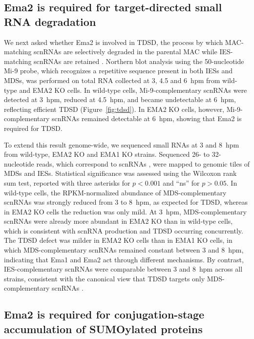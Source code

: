 \documentclass[11pt]{article}
\begin{document}
\subsection{Ema2 is required for target-directed small RNA degradation}

We next asked whether Ema2 is involved in TDSD, the process by which
MAC-matching scnRNAs are selectively degraded in the parental MAC while
IES-matching scnRNAs are retained \citep{aronica2008ema1,schoeberl2012biased}.
Northern blot analysis using the 50-nucleotide Mi-9 probe, which recognizes
a repetitive sequence present in both IESs and MDSs, was performed on total
RNA collected at 3, 4.5 and 6~hpm from wild-type and EMA2 KO cells. In
wild-type cells, Mi-9-complementary scnRNAs were detected at 3~hpm, reduced
at 4.5~hpm, and became undetectable at 6~hpm, reflecting efficient TDSD
(Figure~\ref{fig:tdsd}). In EMA2 KO cells, however, Mi-9-complementary
scnRNAs remained detectable at 6~hpm, showing that Ema2 is required for
TDSD.

To extend this result genome-wide, we sequenced small RNAs at 3 and 8~hpm
from wild-type, EMA2 KO and EMA1 KO strains. Sequenced 26- to 32-nucleotide
reads, which correspond to scnRNAs \citep{schoeberl2012biased}, were mapped
to genomic tiles of MDSs and IESs. Statistical significance was assessed
using the Wilcoxon rank sum test, reported with three asterisks for
$p < 0.001$ and ``ns'' for $p > 0.05$. In wild-type cells, the
RPKM-normalized abundance of MDS-complementary scnRNAs was strongly reduced
from 3 to 8~hpm, as expected for TDSD, whereas in EMA2 KO cells the
reduction was only mild. At 3~hpm, MDS-complementary scnRNAs were
already more abundant in EMA2 KO than in wild-type cells, which is
consistent with scnRNA production and TDSD occurring concurrently. The
TDSD defect was milder in EMA2 KO cells than in EMA1 KO cells, in which
MDS-complementary scnRNAs remained constant between 3 and 8~hpm, indicating
that Ema1 and Ema2 act through different mechanisms. By contrast,
IES-complementary scnRNAs were comparable between 3 and 8~hpm across all
strains, consistent with the canonical view that TDSD targets only
MDS-complementary scnRNAs \citep{aronica2008ema1,schoeberl2012biased}.

\subsection{Ema2 is required for conjugation-stage accumulation of
SUMOylated proteins}
\end{document}

